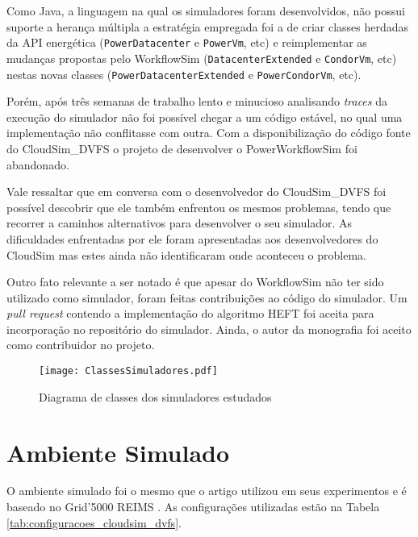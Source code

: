 Como Java, a linguagem na qual os simuladores foram desenvolvidos, não possui
suporte a herança múltipla a estratégia empregada foi a de criar classes
herdadas da API energética (\texttt{PowerDatacenter} e \texttt{PowerVm}, etc) e
reimplementar as mudanças propostas pelo WorkflowSim
(\texttt{DatacenterExtended} e \texttt{CondorVm}, etc) nestas novas
classes (\texttt{PowerDatacenterExtended} e \texttt{PowerCondorVm}, etc).

Porém, após três semanas de trabalho lento e minucioso analisando \emph{traces}
da execução do simulador não foi possível chegar a um código estável, no qual
uma implementação não conflitasse com outra. Com a disponibilização
do código fonte do CloudSim\_DVFS o projeto de desenvolver o PowerWorkflowSim
foi abandonado.

Vale ressaltar que em conversa com o desenvolvedor do CloudSim\_DVFS foi
possível descobrir que ele também enfrentou os mesmos problemas, tendo que
recorrer a caminhos alternativos para desenvolver o seu simulador. As
dificuldades enfrentadas por ele foram apresentadas aos desenvolvedores do
CloudSim mas estes ainda não identificaram onde aconteceu o problema.

Outro fato relevante a ser notado é que apesar do WorkflowSim não ter sido
utilizado como simulador, foram feitas contribuições ao código do simulador.
Um \emph{pull request} contendo a implementação do algoritmo HEFT foi aceita
para incorporação no repositório do simulador. Ainda, o autor da monografia
foi aceito como contribuidor no projeto.

\begin{figure}[ht]
\centering
\texttt{[image: ClassesSimuladores.pdf]}
\caption{Diagrama de classes dos simuladores estudados}
\label{fig:classes_simuladores}
\end{figure}

\section{Ambiente Simulado}
\label{sec:ambiente_simulado}

O ambiente simulado foi o mesmo que o artigo
\cite{guerout:energy_aware_simulation} utilizou em seus experimentos e é baseado
no Grid'5000 REIMS \cite{cappello:grid5000}. As configurações utilizadas estão
na Tabela \ref{tab:configuracoes_cloudsim_dvfs}.

